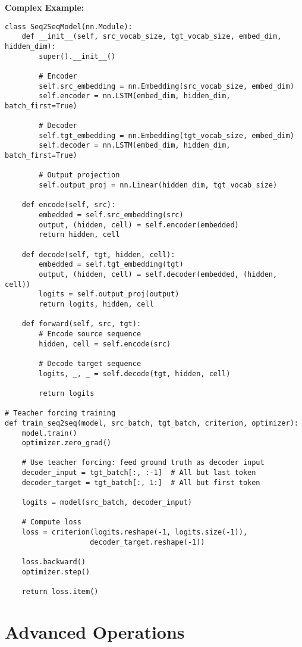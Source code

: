 \documentclass[11pt,a4paper]{book}
\begin{document}
\textbf{Complex Example:}
\begin{verbatim}
class Seq2SeqModel(nn.Module):
    def __init__(self, src_vocab_size, tgt_vocab_size, embed_dim, hidden_dim):
        super().__init__()
        
        # Encoder
        self.src_embedding = nn.Embedding(src_vocab_size, embed_dim)
        self.encoder = nn.LSTM(embed_dim, hidden_dim, batch_first=True)
        
        # Decoder
        self.tgt_embedding = nn.Embedding(tgt_vocab_size, embed_dim)
        self.decoder = nn.LSTM(embed_dim, hidden_dim, batch_first=True)
        
        # Output projection
        self.output_proj = nn.Linear(hidden_dim, tgt_vocab_size)
        
    def encode(self, src):
        embedded = self.src_embedding(src)
        output, (hidden, cell) = self.encoder(embedded)
        return hidden, cell
    
    def decode(self, tgt, hidden, cell):
        embedded = self.tgt_embedding(tgt)
        output, (hidden, cell) = self.decoder(embedded, (hidden, cell))
        logits = self.output_proj(output)
        return logits, hidden, cell
    
    def forward(self, src, tgt):
        # Encode source sequence
        hidden, cell = self.encode(src)
        
        # Decode target sequence
        logits, _, _ = self.decode(tgt, hidden, cell)
        
        return logits

# Teacher forcing training
def train_seq2seq(model, src_batch, tgt_batch, criterion, optimizer):
    model.train()
    optimizer.zero_grad()
    
    # Use teacher forcing: feed ground truth as decoder input
    decoder_input = tgt_batch[:, :-1]  # All but last token
    decoder_target = tgt_batch[:, 1:]  # All but first token
    
    logits = model(src_batch, decoder_input)
    
    # Compute loss
    loss = criterion(logits.reshape(-1, logits.size(-1)), 
                    decoder_target.reshape(-1))
    
    loss.backward()
    optimizer.step()
    
    return loss.item()
\end{verbatim}

\chapter{Advanced Operations}
\end{document}
